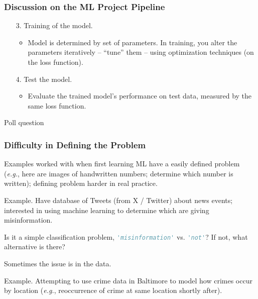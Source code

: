 \documentclass{beamer}
\newenvironment{codeblock}
    {\hfill\begin{beamerboxesrounded}[lower=codecol, width=0.8\textwidth]
    \medskip

    }
    { 
    \end{beamerboxesrounded}\hfill
    }
\theoremstyle{example}
\newcommand{\st}[1]{\lstinline[language=Python,basicstyle=\ttfamily,stringstyle=\small\color{strings}]!#1!}
\newcommand{\gnum}[1]{{\color{mygreen}#1.}}
\begin{document}
\begin{frame}
\frametitle{Discussion on the ML Project Pipeline}
    \begin{enumerate}
        \item[\gnum{3}] Training of the model.%
        \begin{itemize}
            \item Model is determined by set of parameters. In training, you alter the parameters iteratively {--} ``tune'' them {--} using optimization techniques (on the loss function).
        \end{itemize}
        \pause
        \item[\gnum{4}] Test the model.
        \begin{itemize}
            \item Evaluate the trained model's performance on test data, measured by the same loss function.
        \end{itemize}
    \end{enumerate}
\end{frame}

\begin{frame}[standout]
    Poll question
\end{frame}

\begin{frame}
\frametitle{Difficulty in Defining the Problem}
    Examples worked with when first learning ML have a easily defined problem (\textit{e.g.}, here are images of handwritten numbers; determine which number is written); defining problem harder in real practice.  
    \pause

    \begin{codeblock}
        \textcolor{mygreen}{Example.} Have database of Tweets (from X / Twitter) about news events; interested in using machine learning to determine which are giving misinformation.

        Is it a simple classification problem, {\small\st{'misinformation'}} vs. {\small\st{'not'}}? If not, what alternative is there?
    \end{codeblock}

    \pause
    Sometimes the issue is in the data. 
    
    \begin{codeblock}
        \textcolor{mygreen}{Example.} Attempting to use crime data in Baltimore to model how crimes occur by location (\textit{e.g.}, reoccurrence of crime at same location shortly after).
    \end{codeblock}

\end{frame}
\end{document}
